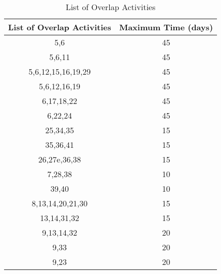 \begin{table}[ht]	
	\begin{center}
		\begin{tabular}{ |c|c| } 
			\hline
			List of Overlap Activities& Maximum Time (days) \\ 
			\hline
			5,6&  45\\ 
			\hline
			5,6,11&45   \\ 
			\hline
			5,6,12,15,16,19,29&45   \\ 
			\hline
			5,6,12,16,19&45   \\ 
			\hline
			6,17,18,22&45   \\ 
			\hline
			6,22,24&45   \\ 
			\hline
			25,34,35&15   \\ 
			\hline
			35,36,41&15   \\ 
			\hline
			26,27e,36,38&15   \\ 
			\hline
			7,28,38& 10   \\ 
			\hline
			39,40&10   \\ 
			\hline
			8,13,14,20,21,30&15   \\ 
			\hline
			13,14,31,32&15   \\ 
			\hline
			9,13,14,32&20   \\ 
			\hline
			9,33&20 \\ 
			\hline
			9,23&20 \\ 
			\hline
		\end{tabular}
	\end{center}
	\caption[List of Overlap Activities]{List of Overlap Activities}
	\label{tab:caption4}
\end{table}%
\clearpage
